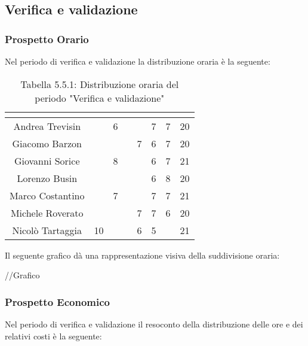 \subsection{Verifica e validazione}

\subsubsection{Prospetto Orario}
Nel periodo di verifica e validazione la distribuzione oraria è la seguente:

\renewcommand{\arraystretch}{1.5}
\begin{table}[H]
\begin{center}
\begin{tabular}{|c|c|c|c|c|c|c|c|}
\hline
\rowcolor{title_row}
\textbf{\color{title_text}{Nome}} & \textbf{\color{title_text}{Resp.}} & \textbf{\color{title_text}{Ammi.}} & \textbf{\color{title_text}{Analist.}} & \textbf{\color{title_text}{Progett.}} & \textbf{\color{title_text}{Program.}} & \textbf{\color{title_text}{Verific.}} & \textbf{\color{title_text}{Totale}} \\ \hline
Andrea Trevisin  & & 6 & & & 7 & 7 & 20  \\ \hline
Giacomo Barzon   & & & & 7 & 6 & 7 & 20  \\ \hline
Giovanni Sorice  & & 8 & &  & 6 & 7 & 21  \\ \hline
Lorenzo Busin    & & & & & 6 & 8 & 20  \\ \hline
Marco Costantino & & 7 & & & 7 & 7 & 21  \\ \hline
Michele Roverato & & & & 7 & 7 & 6 & 20  \\ \hline
Nicolò Tartaggia & 10 & & & 6 & 5 & & 21  \\ \hline
\end{tabular}
\caption{Tabella 5.5.1: Distribuzione oraria del periodo "Verifica e validazione"\label{}}
\end{center}
\end{table}
\renewcommand{\arraystretch}{1}

Il seguente grafico dà una rappresentazione visiva della suddivisione oraria: \\
\begin{center}
//Grafico
\end{center}


\subsubsection{Prospetto Economico}
Nel periodo di verifica e validazione il resoconto della distribuzione delle ore e dei relativi costi è la seguente:

